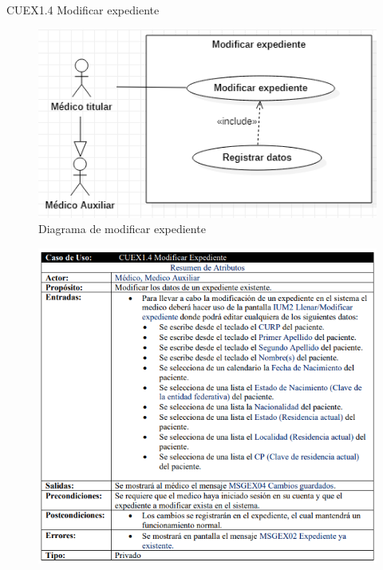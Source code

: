 \documentclass[12pt,letterpaper]{article}
\begin{document}
            \newpage
            CUEX1.4 Modificar expediente
            \begin{figure}[H]
                \centering
                \includegraphics [scale=0.5]{casosUso/modificarExpediente}
                \caption{Diagrama de modificar expediente}
            \end{figure}
            \begin{figure}[H]
                \centering
                \includegraphics [scale=0.8]{specs/specModificarExpediente}
            \end{figure}
\end{document}
